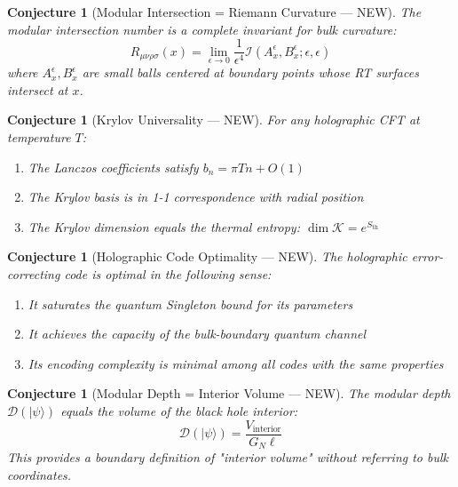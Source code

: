 \documentclass[12pt,a4paper]{article}
\newtheorem{conjecture}[theorem]{Conjecture}
\begin{document}
\begin{conjecture}[Modular Intersection = Riemann Curvature --- NEW]
The modular intersection number is a complete invariant for bulk curvature:
\begin{equation}
R_{\mu\nu\rho\sigma}(x) = \lim_{\epsilon \to 0} \frac{1}{\epsilon^4} \mathcal{I}(A_x^\epsilon, B_x^\epsilon; \epsilon, \epsilon)
\end{equation}
where $A_x^\epsilon, B_x^\epsilon$ are small balls centered at boundary points whose RT surfaces intersect at $x$.
\end{conjecture}

\begin{conjecture}[Krylov Universality --- NEW]
For any holographic CFT at temperature $T$:
\begin{enumerate}
    \item The Lanczos coefficients satisfy $b_n = \pi T n + O(1)$
    \item The Krylov basis is in 1-1 correspondence with radial position
    \item The Krylov dimension equals the thermal entropy: $\dim \mathcal{K} = e^{S_{\text{th}}}$
\end{enumerate}
\end{conjecture}

\begin{conjecture}[Holographic Code Optimality --- NEW]
The holographic error-correcting code is optimal in the following sense:
\begin{enumerate}
    \item It saturates the quantum Singleton bound for its parameters
    \item It achieves the capacity of the bulk-boundary quantum channel
    \item Its encoding complexity is minimal among all codes with the same properties
\end{enumerate}
\end{conjecture}

\begin{conjecture}[Modular Depth = Interior Volume --- NEW]
The modular depth $\mathcal{D}(|\psi\rangle)$ equals the volume of the black hole interior:
\begin{equation}
\mathcal{D}(|\psi\rangle) = \frac{V_{\text{interior}}}{G_N \ell}
\end{equation}
This provides a boundary definition of "interior volume" without referring to bulk coordinates.
\end{conjecture}
\end{document}
